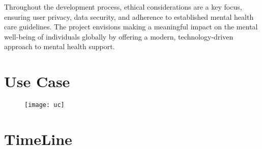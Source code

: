 Throughout the development process, ethical considerations are a key focus, ensuring user privacy, data security, and adherence to established mental health care guidelines. The project envisions making a meaningful impact on the mental well-being of individuals globally by offering a modern, technology-driven approach to mental health support.
 
\newpage
\section{Use Case}
\begin{figure}[h]
    \begin{center}
        \texttt{[image: uc]}
    \end{center}
\centering
\end{figure}



\newpage
\section{TimeLine}
\begin{figure}[h]
    \begin{center}
    \end{center}
\centering
\end{figure}
